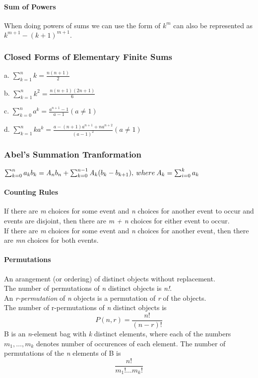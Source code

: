 \documentclass[10pt,twocolumn]{article}
\newenvironment{packed_list}{
\begin{itemize}
  \setlength{\itemsep}{1pt}
  \setlength{\parskip}{0pt}
  \setlength{\parsep}{0pt}
}{\end{itemize}}
\begin{document}
	\paragraph*{Sum of Powers}
	When doing powers of sums we can use the form of $k^m$ can also be
	represented as $k^{m+1} - ( k + 1)^{m+1}.$

	\subsubsection*{Closed Forms of Elementary Finite Sums}
	\begin{packed_list}
        \item[a.] $\sum_{k=1}^n k = \frac{n(n+1)}{2}$
	\item[b.] $\sum_{k=1}^n k^2 = \frac{n(n+1)(2n+1)}{6}$
	\item[c.] $\sum_{k=0}^n a^k = \frac{a^{n+1} - 1}{a -1} ( a \neq
	1)$
	\item[d.] $
\sum_{k=1}^n ka^k = \frac{a - (n + 1)a^{n+1} +
	  na^{n+2}}{(a-1)^2} (a \neq 1)$
        \end{packed_list}

	\subsubsection*{Abel's Summation Tranformation}
	$\sum_{k=0}^n a_kb_k = \mathit{A}_nb_n + \sum_{k=0}^{n-1}
	\mathit{A}_k(b_k - b_{k+1}),\\
	  \:where\:A_k = \sum_{i=0}^k a_k$
	

	\paragraph*{Counting Rules}
	If there are \textit{m} choices for some event and \textit{n}
        choices for another event to occur and events are disjoint,
        then there are \textit{m + n} choices for either event to occur. \\
	If there are \textit{m} choices for some event and \textit{n}
        choices for another event, then there are \textit{mn} choices
        for both events.

	\paragraph*{Permutations}
	An arangement (or ordering) of distinct objects without replacement. \\
	The number of permutations of \textit{n} distinct objects is \textit{n!}. \\
	An \textit{r-permutation} of \textit{n} objects is a
        permutation of \textit{r} of the objects. \\
	The number of r-permutations of \textit{n} distinct objects is
	\[P(n, r)=\frac{n!}{(n - r)!}\]
	B is an \textit{n}-element bag with \textit{k} distinct
        elements, where each of the numbers $m_1,\ldots,m_k$ denotes
        number of occurences of each element.  The number of
        permutations of the \textit{n} elements of B is \[\frac{n!}{m_1! \ldots m_k!}\]
\end{document}
